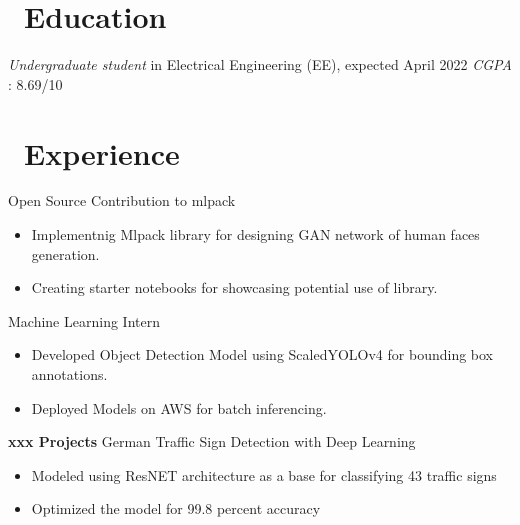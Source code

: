 \documentclass{resume}
\begin{document}



\section{\faGraduationCap\ Education}
\textit{Undergraduate student} in Electrical Engineering (EE), expected April 2022
\textit {CGPA} : 8.69/10


\section{\faUsers\ Experience}
\role{Student Developer}
Open Source Contribution to mlpack
\begin{itemize}
  \item Implementnig Mlpack library for designing GAN network of human faces generation.
  \item Creating starter notebooks for showcasing potential use of library.
\end{itemize}

\role Machine Learning Intern
\begin{itemize}
  \item Developed Object Detection Model using ScaledYOLOv4 for bounding box annotations.
  \item Deployed Models on AWS for batch inferencing.
\end{itemize}

\textbf{xxx Projects}
German Traffic Sign Detection with Deep Learning
\begin{itemize}
  \item Modeled using ResNET architecture as a base for classifying 43 traffic signs
  \item Optimized the model for 99.8 percent accuracy
\end{itemize}
\end{document}
